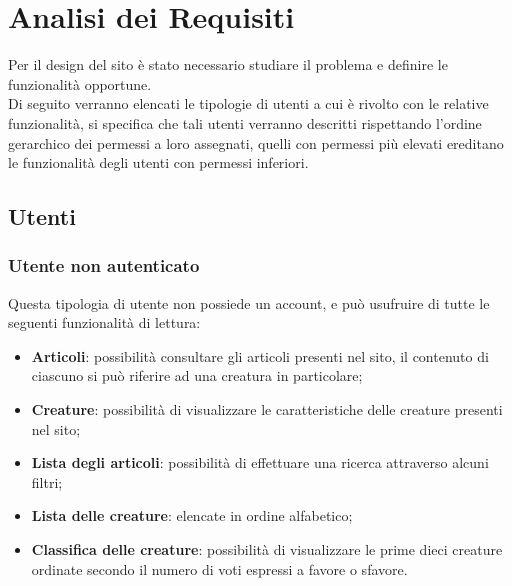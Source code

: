 \section{Analisi dei Requisiti}
\label{sec:analisi-dei-requisiti}

Per il design del sito è stato necessario studiare il problema e definire le funzionalità opportune.\\
Di seguito verranno elencati le tipologie di utenti a cui è rivolto con le relative funzionalità, si specifica che tali utenti verranno descritti rispettando l'ordine gerarchico dei permessi a loro assegnati, quelli con permessi più  elevati ereditano le funzionalità degli utenti con permessi inferiori.

\subsection{Utenti}
\label{subsec:utenti}

\subsubsection{Utente non autenticato}
Questa tipologia di utente non possiede un account, e può usufruire di tutte le seguenti funzionalità di lettura:
\begin{itemize}
    \item \textbf{Articoli}: possibilità consultare gli articoli presenti nel sito, il contenuto di ciascuno si può riferire ad una creatura in particolare;
    \item \textbf{Creature}: possibilità di visualizzare le caratteristiche delle creature presenti nel sito;
    \item \textbf{Lista degli articoli}: possibilità di effettuare una ricerca attraverso alcuni filtri;
    \item \textbf{Lista delle creature}: elencate in ordine alfabetico;
    \item \textbf{Classifica delle creature}: possibilità di visualizzare le prime dieci creature ordinate secondo il numero di voti espressi a favore o sfavore.
\end{itemize}

